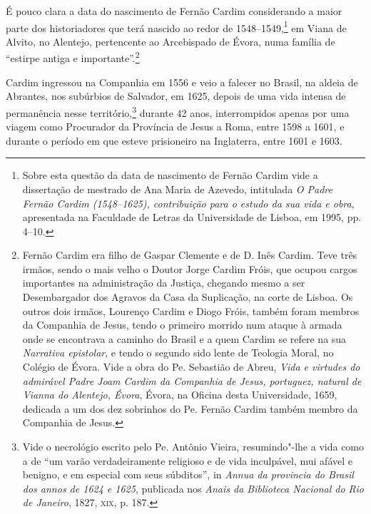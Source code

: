 É pouco clara a data do nascimento de Fernão Cardim considerando a
maior parte dos historiadores que terá nascido ao redor de 
1548--1549,\footnote{ Sobre esta questão da data de nascimento de Fernão
Cardim vide a dissertação de mestrado de Ana Maria de Azevedo, intitulada
\textit{O Padre Fernão Cardim (1548--1625), contribuição para o estudo
da sua vida e obra}, apresentada na Faculdade de Letras da Universidade
de Lisboa, em 1995, pp. 4--10.} em Viana de Alvito, no
Alentejo, pertencente ao Arcebispado de Évora, numa família de ``estirpe
antiga e importante''.\footnote{ Fernão Cardim era filho de Gaspar
Clemente e de D. Inês Cardim. Teve três irmãos, sendo o mais velho o
Doutor Jorge Cardim Fróis, que ocupou cargos importantes na
administração da Justiça, chegando mesmo a ser Desembargador dos
Agravos da Casa da Suplicação, na corte de Lisboa. Os outros dois
irmãos, Lourenço Cardim e Diogo Fróis, também foram membros da
Companhia de Jesus, tendo o primeiro morrido num ataque à armada onde
se encontrava a caminho do Brasil e a quem Cardim se refere na sua
\textit{Narrativa epistolar}, e tendo o segundo sido lente de Teologia
Moral, no Colégio de Évora. Vide a obra do Pe. Sebastião de Abreu,
\textit{Vida e virtudes do admirável Padre Joam Cardim da Companhia de
Jesus, portuguez, natural de Vianna do Alentejo, Évora}, Évora, na
Oficina desta Universidade, 1659, dedicada a um dos dez sobrinhos do
Pe. Fernão Cardim também membro da Companhia de Jesus.}

Cardim ingressou na Companhia em 1556 e veio a falecer no
Brasil, na aldeia de Abrantes, nos subúrbios de Salvador, em 1625,
depois de uma vida intensa de permanência nesse território,\footnote{ Vide 
o necrológio escrito pelo Pe. Antônio Vieira, resumindo"-lhe a
vida como a de ``um varão verdadeiramente religioso e de vida
inculpável, mui afável e benigno, e em especial com seus súbditos'', in
\textit{Annua da provincia do Brasil dos annos de 1624 e 1625}, 
publicada nos \textit{Anais da Biblioteca Nacional do Rio de Janeiro}, 
1827, \textsc{xix}, p. 187.} durante 42 anos, interrompidos
apenas por uma viagem como Procurador da Província de Jesus a Roma,
entre 1598 a 1601, e durante o período em que esteve prisioneiro na
Inglaterra, entre 1601 e 1603. 

